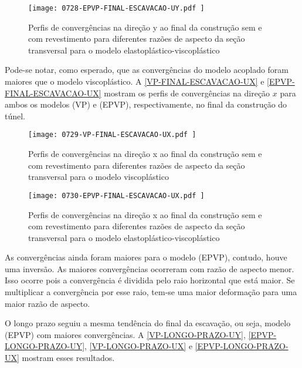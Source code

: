 \begin{figure}[H]
	\begin{center}
		\texttt{[image: 0728-EPVP-FINAL-ESCAVACAO-UY.pdf
		]}
	\end{center}
	\caption{\label{EPVP-FINAL-ESCAVACAO-UY}Perfis de convergências na direção y ao final da construção sem e com revestimento para diferentes razões de aspecto da seção transversal para o modelo elastoplástico-viscoplástico}
\end{figure}

Pode-se notar, como esperado, que as convergências do modelo acoplado foram maiores que o modelo viscoplástico. A \autoref{VP-FINAL-ESCAVACAO-UX} e \autoref{EPVP-FINAL-ESCAVACAO-UX} mostram os perfis de convergências na direção $x$ para ambos os modelos (VP) e (EPVP), respectivamente, no final da construção do túnel.

\begin{figure}[H]
	\begin{center}
		\texttt{[image: 0729-VP-FINAL-ESCAVACAO-UX.pdf
		]}
	\end{center}
	\caption{\label{VP-FINAL-ESCAVACAO-UX}Perfis de convergências na direção x ao final da construção sem e com revestimento para diferentes razões de aspecto da seção transversal para o modelo viscoplástico}
\end{figure}

\begin{figure}[H]
	\begin{center}
		\texttt{[image: 0730-EPVP-FINAL-ESCAVACAO-UX.pdf
		]}
	\end{center}
	\caption{\label{EPVP-FINAL-ESCAVACAO-UX}Perfis de convergências na direção x ao final da construção sem e com revestimento para diferentes razões de aspecto da seção transversal para o modelo elastoplástico-viscoplástico}
\end{figure}
As convergências ainda foram maiores para o modelo (EPVP), contudo, houve uma inversão. As maiores convergências ocorreram com razão de aspecto menor. Isso ocorre pois a convergência é dividida pelo raio horizontal que está maior. Se multiplicar a convergência por esse raio, tem-se uma maior deformação para uma maior razão de aspecto.

O longo prazo seguiu a mesma tendência do final da escavação, ou seja, modelo (EPVP) com maiores convergências. A \autoref{VP-LONGO-PRAZO-UY}, \autoref{EPVP-LONGO-PRAZO-UY}, \autoref{VP-LONGO-PRAZO-UX} e \autoref{EPVP-LONGO-PRAZO-UX} mostram esses resultados.

